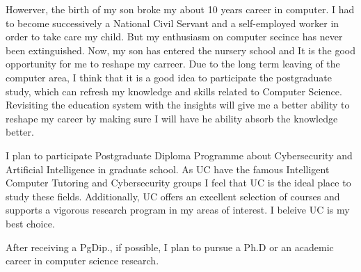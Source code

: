 \documentclass[letterpaper]{article}
\begin{document}
Howerver, the birth of my son broke my about 10 years career in computer. I had to 
become successively a National Civil Servant and a self-employed worker in order 
to take care my child. But my enthusiasm on computer secince has never been 
extinguished. Now, my son has entered the nursery school and It is the good 
opportunity for me to reshape my carreer. Due to the long term leaving of the 
computer area, I think that it is a good idea to participate the postgraduate 
study, which can refresh my knowledge and skills related to Computer Science.
Revisiting the education system with the insights will give me a better 
ability to reshape my career by making sure I will have he ability absorb the 
knowledge better.\vspace{4pt}

I plan to participate Postgraduate Diploma Programme about Cybersecurity and 
Artificial Intelligence in graduate school. As UC have the famous Intelligent 
Computer Tutoring and Cybersecurity groups I feel that UC is the ideal place 
to study these fields. Additionally, UC offers an excellent selection of courses and
supports a vigorous research program in my areas of interest. I beleive UC is my 
best choice.\vspace{4pt}

After receiving a PgDip., if possible, I plan to pursue a Ph.D or an academic 
career in computer science research.\vspace{4pt}
\end{document}
